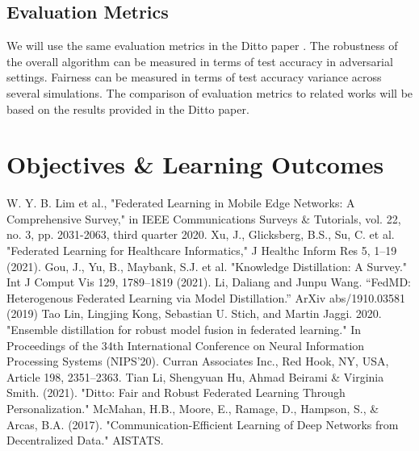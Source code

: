 \documentclass[conference]{IEEEtran}
\begin{document}
\subsection{Evaluation Metrics}
We will use the same evaluation metrics in the Ditto paper \cite{b6}. The robustness of the overall algorithm can be measured in terms of test accuracy in adversarial settings. Fairness can be measured in terms of test accuracy variance across several simulations. The comparison of evaluation metrics to related works will be based on the results provided in the Ditto paper.

\section{Objectives \& Learning Outcomes}


\begin{thebibliography}{00}
 W. Y. B. Lim et al., "Federated Learning in Mobile Edge Networks: A Comprehensive Survey," in IEEE Communications Surveys \& Tutorials, vol. 22, no. 3, pp. 2031-2063, third quarter 2020.
 Xu, J., Glicksberg, B.S., Su, C. et al. "Federated Learning for Healthcare Informatics," J Healthc Inform Res 5, 1–19 (2021).
 Gou, J., Yu, B., Maybank, S.J. et al. "Knowledge Distillation: A Survey." Int J Comput Vis 129, 1789–1819 (2021).
 Li, Daliang and Junpu Wang. “FedMD: Heterogenous Federated Learning via Model Distillation.” ArXiv abs/1910.03581 (2019)
 Tao Lin, Lingjing Kong, Sebastian U. Stich, and Martin Jaggi. 2020. "Ensemble distillation for robust model fusion in federated learning." In Proceedings of the 34th International Conference on Neural Information Processing Systems (NIPS'20). Curran Associates Inc., Red Hook, NY, USA, Article 198, 2351–2363.
 Tian Li, Shengyuan Hu, Ahmad Beirami \& Virginia Smith. (2021). "Ditto: Fair and Robust Federated Learning Through Personalization." 
 McMahan, H.B., Moore, E., Ramage, D., Hampson, S., \& Arcas, B.A. (2017). "Communication-Efficient Learning of Deep Networks from Decentralized Data." AISTATS.
\end{thebibliography}
\end{document}

